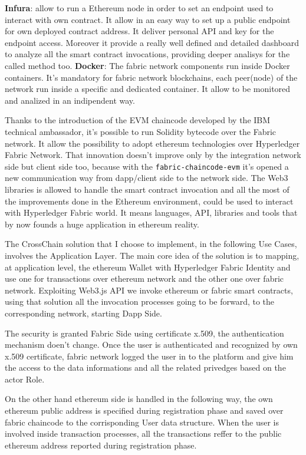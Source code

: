 \begin{outline}
    \1 \textbf{Infura}: allow to run a Ethereum node in order to set an endpoint used to interact with own contract.
    It allow in an easy way to set up a public endpoint for own deployed contract address. It deliver personal 
    API and key for the endpoint access. Moreover it provide a really well defined and detailed dashboard
    to analyze all the smart contract invocations, providing deeper analisys for the called method too.  
    \1 \textbf{Docker}: The fabric network components run inside Docker containers. It's mandatory
    for fabric network blockchains, each peer(node) of the network run inside a specific and 
    dedicated container. It allow to be monitored and analized in an indipendent way. 
\end{outline}

Thanks to the introduction of the EVM chaincode developed by the IBM technical ambassador,
it's possible to run Solidity bytecode over the Fabric network. It allow the possibility to adopt 
ethereum technologies over Hyperledger Fabric Network.
That innovation doesn't improve only by the integration network side but client side too, because with the 
\texttt{fabric-chaincode-evm} it's opened a new communication way from dapp/client side to the network side.
The Web3 libraries is allowed to handle the smart contract invocation and all the most 
of the improvements done in the Ethereum environment, could be used to interact with 
Hyperledger Fabric world. It means languages, API, libraries and tools that by now founds a
huge application in ethereum reality.  
\bigskip

The CrossChain solution that I choose to implement, in the following Use Cases, involves the 
Application Layer.
The main core idea of the solution is to mapping, at application level, the ethereum Wallet with Hyperledger
Fabric Identity and use one for transactions over ethereum network and the other one over fabric network.
Exploiting Web3.js API we invoke ethereum or fabric smart contracts, using that solution all the invocation
processes going to be forward, to the corresponding network, starting Dapp Side. 
\bigskip

The security is granted Fabric Side using certificate x.509, the authentication mechanism doen't
change. Once the user is authenticated and recognized by own x.509 certificate, fabric network logged the user in 
to the platform and give him the access to the data informations and all the related privedges based 
on the actor Role.
\bigskip

On the other hand ethereum side is handled in the following way, the own ethereum public address is specified
during registration phase and saved over fabric chaincode to the corrisponding User data structure.
When the user is involved inside transaction processes, all the transactions reffer to the public ethereum
address reported during registration phase. 
\newline 


